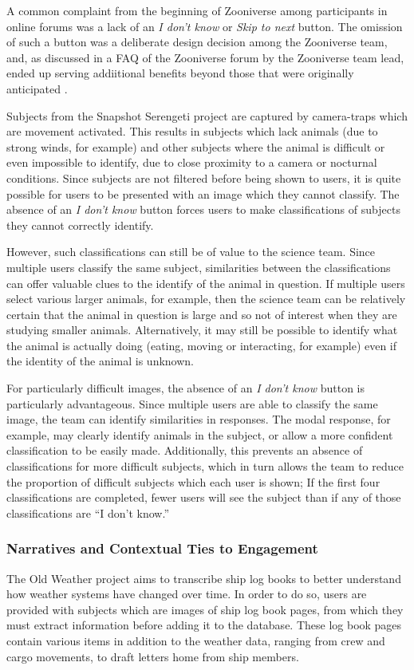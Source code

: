 \documentclass{sigchi}
\begin{document}
A common complaint from the beginning of Zooniverse among participants in online forums was a lack of an \emph{I don't know} or \emph{Skip to next} button.  The omission of such a button was a deliberate design decision among the Zooniverse team, and, as discussed in a FAQ of the Zooniverse forum by the Zooniverse team lead, ended up serving addiitional benefits beyond those that were originally anticipated \cite{afron-blog-post}.

Subjects from the Snapshot Serengeti project are captured by camera-traps which are movement activated. This results in subjects which lack animals (due to strong winds, for example) and other subjects where the animal is difficult or even impossible to identify, due to close proximity to a camera or nocturnal conditions. Since subjects are not filtered before being shown to users, it is quite possible for users to be presented with an image which they cannot classify. The absence of an \emph{I don't know} button forces users to make classifications of subjects they cannot correctly identify.

However, such classifications can still be of value to the science team. Since multiple users classify the same subject, similarities between the classifications can offer valuable clues to the identify of the animal in question. If multiple users select various larger animals, for example, then the science team can be relatively certain that the animal in question is large and so not of interest when they are studying smaller animals. Alternatively, it may still be possible to identify what the animal is actually doing (eating, moving or interacting, for example) even if the identity of the animal is unknown. 

For particularly difficult images, the absence of an \emph{I don't know} button is particularly advantageous. Since multiple users are able to classify the same image, the team can identify similarities in responses. The modal response, for example, may clearly identify animals in the subject, or allow a more confident classification to be easily made. Additionally, this prevents an absence of classifications for more difficult subjects, which in turn allows the team to reduce the proportion of difficult subjects which each user is shown; If the first four classifications are completed, fewer users will see the subject than if any of those classifications are ``I don't know.''


\subsubsection{Narratives and Contextual Ties to Engagement}
The Old Weather project aims to transcribe ship log books to better understand how weather systems have changed over time. In order to do so, users are provided with subjects which are images of ship log book pages, from which they must extract information before adding it to the database. These log book pages contain various items in addition to the weather data, ranging from crew and cargo movements, to draft letters home from ship members. 
\end{document}
